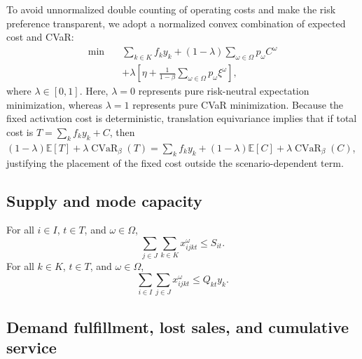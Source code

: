 \documentclass[11pt,a4paper]{article}
\newcommand{\CVaR}{\operatorname{CVaR}}
\begin{document}
To avoid unnormalized double counting of operating costs and make the
risk preference transparent, we adopt a normalized convex combination
of expected cost and CVaR:
\begin{equation}
\begin{aligned}
  \min\quad
  &
  \sum_{k\in K}f_ky_k
  +
  (1-\lambda)
  \sum_{\omega\in\Omega}p_\omega C^\omega
  \\
  &+
  \lambda
  \left[
    \eta
    +
    \frac{1}{1-\beta}
    \sum_{\omega\in\Omega}p_\omega\xi^\omega
  \right],
\end{aligned}
\label{eq:objective}
\end{equation}
where \(\lambda\in[0,1]\). Here, \(\lambda=0\) represents pure
risk-neutral expectation minimization, whereas \(\lambda=1\) represents
pure CVaR minimization. Because the fixed activation cost is deterministic,
translation equivariance implies that if total cost is \(T=\sum_kf_ky_k+C\), then
\((1-\lambda)\mathbb{E}[T]+\lambda\CVaR_\beta(T) = \sum_k f_ky_k+(1-\lambda)\mathbb{E}[C]+\lambda\CVaR_\beta(C)\),
justifying the placement of the fixed cost outside the scenario-dependent term.

\subsection{Supply and mode capacity}

For all \(i\in I\), \(t\in T\), and \(\omega\in\Omega\),
\begin{equation}
  \sum_{j\in J}\sum_{k\in K}
  x_{ijkt}^{\omega}
  \leq S_{it}.
  \label{eq:supply}
\end{equation}
For all \(k\in K\), \(t\in T\), and \(\omega\in\Omega\),
\begin{equation}
  \sum_{i\in I}\sum_{j\in J}
  x_{ijkt}^{\omega}
  \leq Q_{kt}y_k.
  \label{eq:mode-capacity}
\end{equation}

\subsection{Demand fulfillment, lost sales, and cumulative service}
\end{document}

